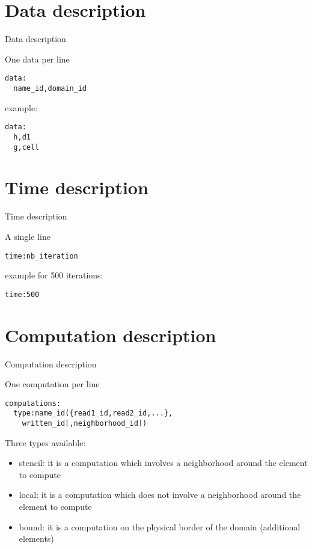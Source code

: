 \documentclass{beamer}
\begin{document}
\section{Data description}
\begin{frame}[fragile]{Data description}
\begin{block}{One data per line}
\begin{lstlisting}[basicstyle=\footnotesize]
data:
  name_id,domain_id
\end{lstlisting}
\end{block}
example:\\
\begin{lstlisting}[basicstyle=\footnotesize]
data:
  h,d1
  g,cell
\end{lstlisting}
\end{frame}

\section{Time description}
\begin{frame}[fragile]{Time description}
\begin{block}{A single line}
\begin{lstlisting}[basicstyle=\footnotesize]
time:nb_iteration
\end{lstlisting}
\end{block}
example for 500 iterations:\\
\begin{lstlisting}[basicstyle=\footnotesize]
time:500
\end{lstlisting}
\end{frame}

\section{Computation description}
\begin{frame}[fragile]{Computation description}
\begin{block}{One computation per line}
\begin{lstlisting}[basicstyle=\footnotesize]
computations:
  type:name_id({read1_id,read2_id,...},
    written_id[,neighborhood_id])
\end{lstlisting}
\end{block}
Three types available:
\begin{itemize}
\item stencil: it is a computation which involves a neighborhood around the element to compute
\item local:  it is a computation which does not involve a neighborhood around the element to compute
\item bound: it is a computation on the physical border of the domain (additional elements)
\end{itemize}
\end{frame}
\end{document}
